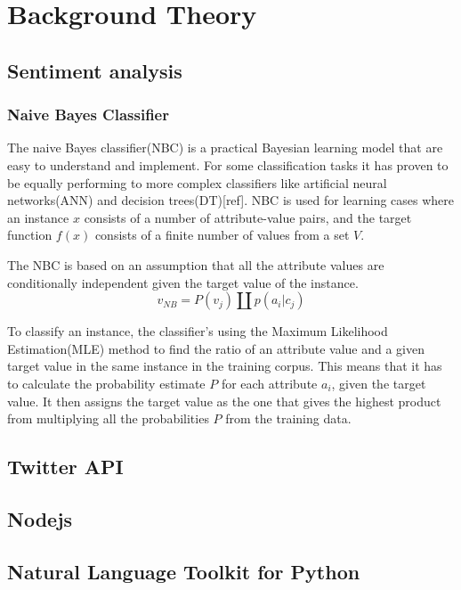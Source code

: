 \section{Background Theory}
	\subsection{Sentiment analysis}
		\subsubsection{Naive Bayes Classifier}
		The naive Bayes classifier(NBC) is a practical Bayesian learning model that are easy to understand and implement. For some classification tasks it has proven to be equally performing to more complex classifiers like artificial neural networks(ANN) and decision trees(DT)[ref]. NBC is used for learning cases where an instance $x$ consists of a number of attribute-value pairs, and the target function $f(x)$ consists of a finite number of values from a set $V$.

The NBC is based on an assumption that all the attribute values are conditionally independent given the target value of the instance.
\begin{equation}
\label{equation:nbc}
v_{NB} = P(v_j) \amalg p(a_i|c_j)
\end{equation}

To classify an instance, the classifier's using the Maximum Likelihood Estimation(MLE) method to find the ratio of an attribute value and a given target value in the same instance in the training corpus. This means that it has to calculate the probability estimate $P$ for each attribute $a_i$, given the target value. It then assigns the target value as the one that gives the highest product from multiplying all the probabilities $P$ from the training data.
	\subsection{Twitter API}
	\subsection{Nodejs}
	\subsection{Natural Language Toolkit for Python}